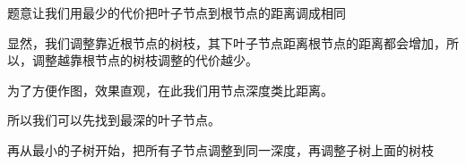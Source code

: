 题意让我们用最少的代价把叶子节点到根节点的距离调成相同

显然，我们调整靠近根节点的树枝，其下叶子节点距离根节点的距离都会增加，所以，调整越靠根节点的树枝调整的代价越少。

为了方便作图，效果直观，在此我们用节点深度类比距离。

所以我们可以先找到最深的叶子节点。

再从最小的子树开始，把所有子节点调整到同一深度，再调整子树上面的树枝